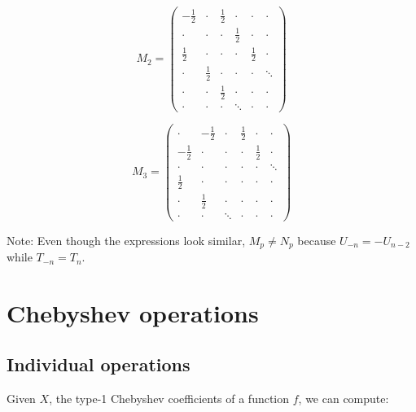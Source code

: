 \documentclass{article}
\begin{document}
\begin{equation*}
\renewcommand*{\arraystretch}{1.2}
M_2 =
\begin{pmatrix}
-\frac{1}{2} & \cdot & \frac{1}{2} & \cdot & \cdot & \cdot \\
\cdot & \cdot & \cdot & \frac{1}{2} & \cdot & \cdot \\
\frac{1}{2} & \cdot & \cdot & \cdot & \frac{1}{2} & \cdot \\
\cdot & \frac{1}{2} & \cdot & \cdot & \cdot & \ddots \\
\cdot & \cdot & \frac{1}{2} & \cdot & \cdot & \cdot \\
\cdot & \cdot & \cdot & \ddots & \cdot & \cdot
\end{pmatrix}
\end{equation*}

\begin{equation*}
\renewcommand*{\arraystretch}{1.2}
M_3 =
\begin{pmatrix}
\cdot & -\frac{1}{2} & \cdot & \frac{1}{2} & \cdot & \cdot \\
-\frac{1}{2} & \cdot & \cdot & \cdot & \frac{1}{2} & \cdot \\
\cdot & \cdot & \cdot & \cdot & \cdot & \ddots \\
\frac{1}{2} & \cdot & \cdot & \cdot & \cdot & \cdot \\
\cdot & \frac{1}{2} & \cdot & \cdot & \cdot & \cdot \\
\cdot & \cdot & \ddots & \cdot & \cdot & \cdot
\end{pmatrix}
\end{equation*}

Note: Even though the expressions look similar, $M_p \neq N_p$ because $U_{-n} = -U_{n-2}$ while $T_{-n} = T_n$.

\section{Chebyshev operations}

\subsection{Individual operations}

Given $X$, the type-1 Chebyshev coefficients of a function $f$, we can compute:
\end{document}
